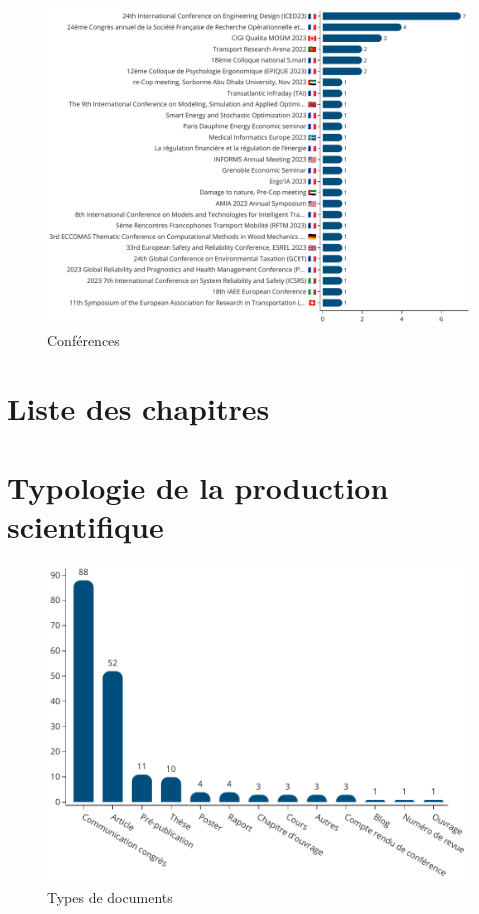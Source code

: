 \documentclass[french, 11pt]{../../dibiso/biso}
\begin{document}
\begin{figure}[!h]
  \includegraphics[width=\textwidth]{figures/conferences.pdf}
  \centering
  \caption{Conférences}
  \label{fig_conferences}
\end{figure}


\pagebreak

\section{Liste des chapitres}

{
  \footnotesize
  
}


\pagebreak

\section{Typologie de la production scientifique}

\begin{figure}[!h]
  \includegraphics[width=\textwidth]{figures/document_types.pdf}
  \centering
  \caption{Types de documents}
  \label{fig_doc_type}
\end{figure}
\end{document}
